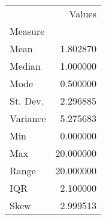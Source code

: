 \begin{tabu}{lr}
\toprule
 & Values \\
Measure &  \\
\midrule
Mean & 1.802870 \\
Median & 1.000000 \\
Mode & 0.500000 \\
St. Dev. & 2.296885 \\
Variance & 5.275683 \\
Min & 0.000000 \\
Max & 20.000000 \\
Range & 20.000000 \\
IQR & 2.100000 \\
Skew & 2.999513 \\
\bottomrule
\end{tabu}